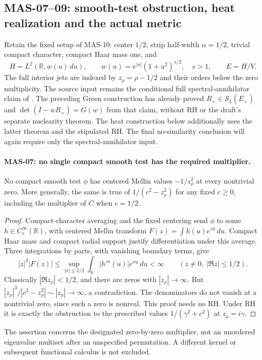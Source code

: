 \documentclass[11pt,a4paper]{article}
\newcommand{\R}{\mathbb R}
\newcommand{\fid}[1]{\textsf{#1}}
\begin{document}
\subsection{MAS-07--09: smooth-test obstruction, heat realization and the actual metric}
Retain the fixed setup of \fid{MAS-10}: center $1/2$, strip half-width $\alpha=1/2$, trivial compact character, compact Haar mass one, and
\[
 H=L^2(\R,w(u)\,du),\qquad
 w(u)=e^{|u|}(1+u^2)^{s/2},\quad s>1,\qquad E=H/V.
\]
The full interior jets are indexed by $z_\rho=\rho-1/2$ and their orders below the zero multiplicity. The source input remains the conditional full spectral-annihilator claim of \cite[Theorem 10.2.2.1, (10.2.2.4)--(10.2.2.6), p.~446]{masullo}. The preceding Green construction has already proved $R_+\in\mathcal S_1(E_+)$ and $\det(I-wR_+)=G(w)$ from that claim, without RH or the draft's separate nuclearity theorem. The heat construction below additionally uses the latter theorem and the stipulated RH. The final no-similarity conclusion will again require only the spectral-annihilator input.

\paragraph{MAS-07: no single compact smooth test has the required multiplier.}
No compact smooth test $\phi$ has centered Mellin values $-1/z_\rho^2$ at every nontrivial zero. More generally, the same is true of $1/(c^2-z_\rho^2)$ for any fixed $c\ge0$, including the multiplier of $C$ when $c=1/2$.
\begin{proof}
Compact-character averaging and the fixed centering send $\phi$ to some $h\in C_c^\infty(\R)$, with centered Mellin transform
$F(z)=\int h(u)e^{zu}\,du$. Compact Haar mass and compact radial support justify differentiation under this average. Three integrations by parts, with vanishing boundary terms, give
\[
 |z|^3|F(z)|\le
 \sup_{|\sigma|\le1/2}\int_\R |h'''(u)|e^{\sigma u}\,du<\infty
 \qquad(z\ne0,\ |\Re z|\le1/2).
\]
Classically $|\Re z_\rho|<1/2$, and there are zeros with $|z_\rho|\to\infty$. But
$|z_\rho|^3/|c^2-z_\rho^2|\sim|z_\rho|\to\infty$, a contradiction. The denominators do not vanish at a nontrivial zero, since such a zero is nonreal. This proof needs no RH. Under RH it is exactly the obstruction to the prescribed values $1/(\gamma^2+c^2)$ at $z_\rho=i\gamma$.
\end{proof}
The assertion concerns the designated zero-by-zero multiplier, not an unordered eigenvalue multiset after an unspecified permutation. A different kernel or subsequent functional calculus is not excluded.
\end{document}
